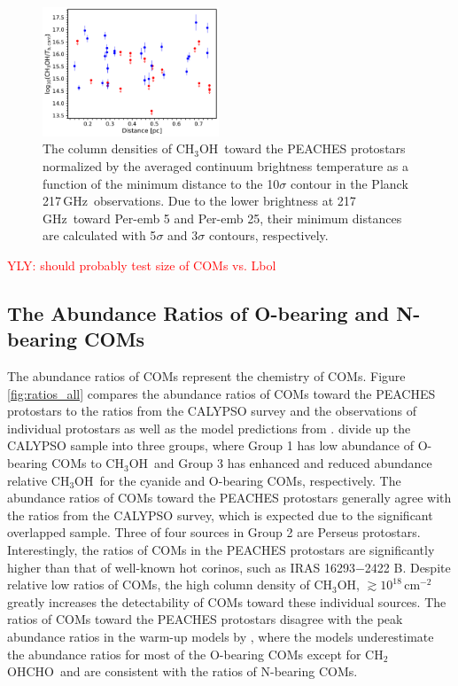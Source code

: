 \documentclass[twocolumn]{aastex62}
\newcommand{\ghz}{\mbox{\,GHz}}
\newcommand{\methanol}{\mbox{CH$_{3}$OH}}
\newcommand{\glycolaldehyde}{\mbox{CH$_{2}$OHCHO}}
\begin{document}
\begin{figure}[htbp!]
  \centering
  \includegraphics[width=0.47\textwidth]{ch3oh_Dmin.pdf}
  \caption{The column densities of \methanol\ toward the PEACHES protostars normalized by the averaged continuum brightness temperature as a function of the minimum distance to the 10$\sigma$ contour in the Planck 217\ghz\ observations.  Due to the lower brightness at 217\ghz\ toward Per-emb 5 and Per-emb 25, their minimum distances are calculated with 5$\sigma$ and 3$\sigma$ contours, respectively.}
  \label{fig:Dmin}
\end{figure}

\textcolor{red}{YLY: should probably test size of COMs vs. Lbol}

\subsection{The Abundance Ratios of O-bearing and N-bearing COMs}
\label{sec:ratios}

The abundance ratios of COMs represent the chemistry of COMs.  Figure\,\ref{fig:ratios_all} compares the abundance ratios of COMs toward the PEACHES protostars to the ratios from the CALYPSO survey \citep{2020A&A...635A.198B} and the observations of individual protostars as well as the model predictions from \citet{2013ApJ...765...60G}.  \citet{2020A&A...635A.198B} divide up the CALYPSO sample into three groups, where Group 1 has low abundance of O-bearing COMs to \methanol\ and Group 3 has enhanced and reduced abundance relative \methanol\ for the cyanide and O-bearing COMs, respectively.  The abundance ratios of COMs toward the PEACHES protostars generally agree with the ratios from the CALYPSO survey, which is expected due to the significant overlapped sample.  Three of four sources in Group 2 are Perseus protostars.  Interestingly, the ratios of COMs in the PEACHES protostars are significantly higher than that of well-known hot corinos, such as IRAS 16293$-$2422 B.  Despite relative low ratios of COMs, the high column density of \methanol, $\gtrsim 10^{18}$\,cm$^{-2}$ greatly increases the detectability of COMs toward these individual sources.  The ratios of COMs toward the PEACHES protostars disagree with the peak abundance ratios in the warm-up models by \citet{2013ApJ...765...60G}, where the models underestimate the abundance ratios for most of the O-bearing COMs except for \glycolaldehyde\ and are consistent with the ratios of N-bearing COMs.
\end{document}
